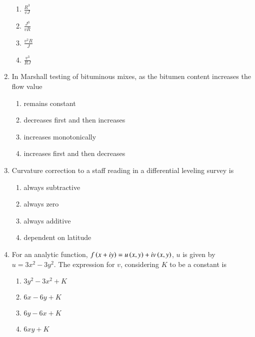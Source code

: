 \documentclass[journal,onecolumn]{IEEEtran}
\theoremstyle{remark}
\begin{document}
\begin{enumerate}
	\begin{enumerate}
		\item $\frac{R^3}{vJ}$
		\item $\frac{J^3}{vR}$
		\item $\frac{v^2R}{J}$
		\item $\frac{v^3}{RJ}$
	\end{enumerate}


    \item In Marshall testing of bituminous mixes, as the bitumen content increases the flow value
	\hfill{}

	\begin{enumerate}
		\item remains constant
		\item decreases first and then increases
		\item increases monotonically
		\item increases first and then decreases
	\end{enumerate}


    \item Curvature correction to a staff reading in a differential leveling survey is
	\hfill{}

	\begin{enumerate}
		\item always subtractive
		\item always zero 
		\item always additive
		\item dependent on latitude
	\end{enumerate}

    \item For an analytic function, $f\left(x + iy\right) = u\left(x, y\right) + iv\left(x, y\right)$, $u$ is given by $u = 3x^2 - 3y^2$. The expression for $v$, considering $K$ to be a constant is

	\hfill{}
	\begin{enumerate}
		\item $3y^2 - 3x^2 + K$
		\item $6x- 6y + K$
		\item $6y - 6x + K$
		\item $6xy + K$
	\end{enumerate}


\end{enumerate}
\end{document}
